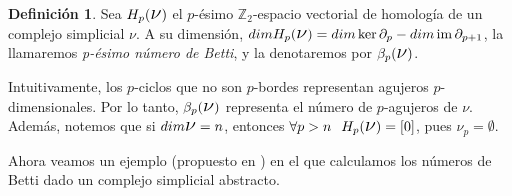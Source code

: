 \documentclass[12pt, a4paper, twoside]{book}
\numberwithin{equation}{section}
\theoremstyle{definition}
\newtheorem{defi}{Definición}[section]
\theoremstyle{remark}
\theoremstyle{plain}
\DeclareMathOperator{\Ima}{im}
\begin{document}
	\begin{defi}
		Sea $H_{p}(\text{{\Large $\nu$}})$ el $p$-ésimo 
		$\mathbb{Z}_{2}$-espacio vectorial de homología de un complejo
		simplicial {\Large $\nu$}.
		A su dimensión, $dimH_{p}(\text{{\Large $\nu$}})=
		dim \ker\partial_{p}-dim\Ima\partial_{p+1}$, la 
		llamaremos \textit{p-ésimo número de Betti}, y la denotaremos
		por $\beta_{p}(\text{{\Large $\nu$}})$.
	\end{defi}

	Intuitivamente, los $p$-ciclos que no son $p$-bordes representan agujeros
	$p$-dimensionales. Por lo tanto, $\beta_{p}(\text{{\Large $\nu$}})$ 
	representa el número de $p$-agujeros de {\Large $\nu$}. Además, notemos 
	que si $dim\text{{\Large $\nu$}}=n$, entonces $\forall p >n 
	\hspace{0.25cm} H_{p}(\text{{\Large $\nu$}})=[0]$, pues 
	{\Large $\nu$}$_{p}=\emptyset$.

	Ahora veamos un ejemplo (propuesto en \cite{Intro-Otter}) en el que calculamos 
	los números de Betti dado un complejo simplicial abstracto.
\end{document}
